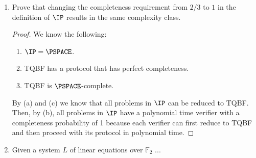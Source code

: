 \documentclass[usletter]{article}
\begin{document}
\begin{enumerate}
   \item Prove that changing the completeness requirement from $2/3$ to $1$ in the definition of $\IP$ results in the same complexity class.

     \begin{proof}
      We know the following:

      \begin{enumerate}
        \item $\IP = \PSPACE$.
        \item TQBF has a protocol that has perfect completeness.
        \item TQBF is $\PSPACE$-complete.
      \end{enumerate}

      By (a) and (c) we know that all problems in $\IP$ can be reduced to TQBF. Then, by (b), all problems in $\IP$ have a polynomial time verifier with a completeness probability of 1 because each verifier can first reduce to TQBF and then proceed with its protocol in polynomial time.
    \end{proof}

    \item Given a system $L$ of linear equations over $\mathbb{F}_2$ ...
\end{enumerate}


\newpage



\end{document}
